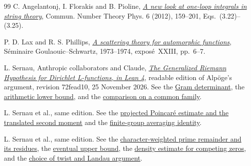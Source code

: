 \documentclass[11pt,letterpaper]{article}
\numberwithin{equation}{section}
\begin{document}
\begin{thebibliography}{99}
 C. Angelantonj, I. Florakis and B. Pioline, \href{https://arxiv.org/abs/1110.5318}{\emph{A new look at one-loop integrals in string theory}}, Commun. Number Theory Phys. 6 (2012), 159--201, Eqs.~(3.22)--(3.25).

 P. D. Lax and R. S. Phillips, \href{https://www.numdam.org/article/SEDP_1973-1974____A21_0.pdf}{\emph{A scattering theory for automorphic functions}}, S\'eminaire Goulaouic--Schwartz, 1973--1974, expos\'e~XXIII, pp.~6--7.

 L. Sernau, Anthropic collaborators and Claude, \href{https://github.com/lsernau/grh-lean/blob/72fead102f663d5c7a407964a13dc0cf9d977207/grh/README.md}{\emph{The Generalized Riemann Hypothesis for Dirichlet L-functions, in Lean 4}}, readable edition of Alp\"oge's argument, revision 72fead10, 25 November 2026. See the \href{https://github.com/lsernau/grh-lean/blob/72fead102f663d5c7a407964a13dc0cf9d977207/grh/src/New/Reduction/Lattices/TwistedLattice.lean\#L264-L276}{Gram determinant}, the \href{https://github.com/lsernau/grh-lean/blob/72fead102f663d5c7a407964a13dc0cf9d977207/grh/src/New/Determinant/Twist/LongForms.lean\#L8-L24}{arithmetic lower bound}, and the \href{https://github.com/lsernau/grh-lean/blob/72fead102f663d5c7a407964a13dc0cf9d977207/grh/src/New/Reduction/MainInequality.lean\#L89-L156}{comparison on a common family}.

 L. Sernau et al., same edition. See the \href{https://github.com/lsernau/grh-lean/blob/72fead102f663d5c7a407964a13dc0cf9d977207/grh/src/New/Spanning/SecondMoment/SpanningTheorem.lean\#L252-L292}{projected Poincar\'e estimate and the translated second moment} and the \href{https://github.com/lsernau/grh-lean/blob/72fead102f663d5c7a407964a13dc0cf9d977207/grh/src/New/Spanning/SecondMoment/FewTranslates.lean\#L288-L303}{finite-group averaging identity}.

 L. Sernau et al., same edition. See the \href{https://github.com/lsernau/grh-lean/blob/72fead102f663d5c7a407964a13dc0cf9d977207/grh/src/New/Reduction/Zeros/PrimeError.lean\#L6-L20}{character-weighted prime remainder and its residues}, the \href{https://github.com/lsernau/grh-lean/blob/72fead102f663d5c7a407964a13dc0cf9d977207/grh/src/New/Reduction/OneSidedBound.lean\#L195-L209}{eventual upper bound}, the \href{https://github.com/lsernau/grh-lean/blob/72fead102f663d5c7a407964a13dc0cf9d977207/grh/src/Lib/Analytic/QuadraticTwist.lean\#L5-L31}{density estimate for competing zeros}, and the \href{https://github.com/lsernau/grh-lean/blob/72fead102f663d5c7a407964a13dc0cf9d977207/grh/src/New/Reduction/Zeros/Criterion.lean\#L31-L84}{choice of twist and Landau argument}.


\end{thebibliography}
\end{document}
